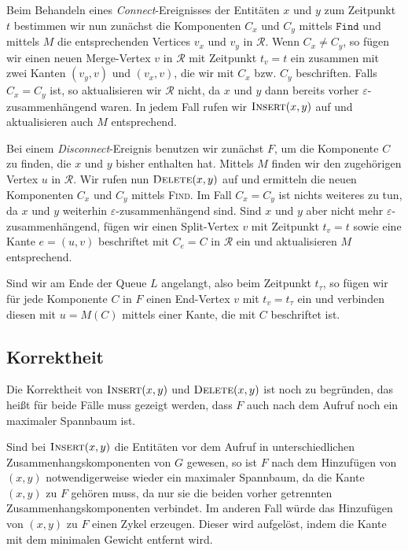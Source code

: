Beim Behandeln eines \emph{Connect}-Ereignisses der Entitäten $x$ und $y$ zum Zeitpunkt $t$ bestimmen wir nun zunächst die Komponenten $C_x$ und $C_y$ mittels $\mathtt{Find}$ und mittels $M$ die entsprechenden Vertices $v_x$ und $v_y$ in $\mathcal{R}$.
Wenn $C_x \neq C_y$, so fügen wir einen neuen Merge-Vertex $v$ in $\mathcal{R}$ mit Zeitpunkt $t_v = t$ ein zusammen mit zwei Kanten $(v_y,v)$ und $(v_x,v)$, die wir mit $C_x$ bzw. $C_y$ beschriften.
Falls $C_x = C_y$ ist, so aktualisieren wir $\mathcal{R}$ nicht, da $x$ und $y$ dann bereits vorher $\varepsilon$-zusammenhängend waren.
In jedem Fall rufen wir $\textsc{Insert}(x,y)$ auf und aktualisieren auch $M$ entsprechend.

Bei einem \emph{Disconnect}-Ereignis benutzen wir zunächst $F$, um die Komponente $C$ zu finden, die $x$ und $y$ bisher enthalten hat.
Mittels $M$ finden wir den zugehörigen Vertex $u$ in $\mathcal{R}$.
Wir rufen nun $\textsc{Delete}(x,y)$ auf und ermitteln die neuen Komponenten $C_x$ und $C_y$ mittels \textsc{Find}.
Im Fall $C_x=C_y$ ist nichts weiteres zu tun, da $x$ und $y$ weiterhin $\varepsilon$-zusammenhängend sind.
Sind $x$ und $y$ aber nicht mehr $\varepsilon$-zusammenhängend, fügen wir einen Split-Vertex $v$ mit Zeitpunkt $t_v=t$ sowie eine Kante $e=(u,v)$ beschriftet mit $C_e=C$ in $\mathcal{R}$ ein und aktualisieren $M$ entsprechend.

Sind wir am Ende der Queue $L$ angelangt, also beim Zeitpunkt $t_\tau$, so fügen wir für jede Komponente $C$ in $F$ einen End-Vertex $v$ mit $t_v=t_\tau$ ein und verbinden diesen mit $u=M(C)$ mittels einer Kante, die mit $C$ beschriftet ist.

\subsection{Korrektheit} %
\label{sub:korrektheit_xy}
Die Korrektheit von $\textsc{Insert}(x,y)$ und $\textsc{Delete}(x,y)$ ist noch zu begründen, das heißt für beide Fälle muss gezeigt werden, dass $F$ auch nach dem Aufruf noch ein maximaler Spannbaum ist.

Sind bei $\textsc{Insert}(x,y)$ die Entitäten vor dem Aufruf in unterschiedlichen Zusammenhangskomponenten von $G$ gewesen, so ist $F$ nach dem Hinzufügen von $(x,y)$ notwendigerweise wieder ein maximaler Spannbaum, da die Kante $(x,y)$ zu $F$ gehören muss, da nur sie die beiden vorher getrennten Zusammenhangskomponenten verbindet.
Im anderen Fall würde das Hinzufügen von $(x,y)$ zu $F$ einen Zykel erzeugen.
Dieser wird aufgelöst, indem die Kante mit dem minimalen Gewicht entfernt wird.

